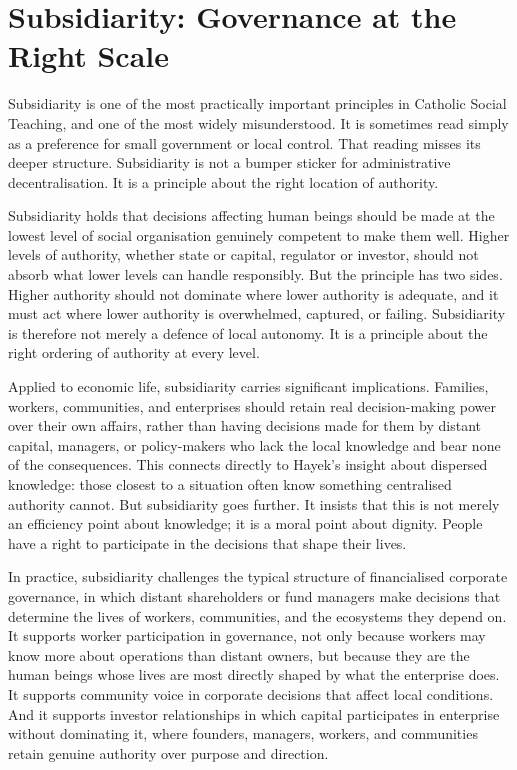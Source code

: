 \documentclass[11pt,a4paper,oneside]{book}
\begin{document}
\section*{Subsidiarity: Governance at the Right Scale}

Subsidiarity is one of the most practically important principles in Catholic Social Teaching, and one of the most widely misunderstood. It is sometimes read simply as a preference for small government or local control. That reading misses its deeper structure. Subsidiarity is not a bumper sticker for administrative decentralisation. It is a principle about the right location of authority.

Subsidiarity holds that decisions affecting human beings should be made at the lowest level of social organisation genuinely competent to make them well. Higher levels of authority, whether state or capital, regulator or investor, should not absorb what lower levels can handle responsibly. But the principle has two sides. Higher authority should not dominate where lower authority is adequate, and it must act where lower authority is overwhelmed, captured, or failing. Subsidiarity is therefore not merely a defence of local autonomy. It is a principle about the right ordering of authority at every level.

Applied to economic life, subsidiarity carries significant implications. Families, workers, communities, and enterprises should retain real decision-making power over their own affairs, rather than having decisions made for them by distant capital, managers, or policy-makers who lack the local knowledge and bear none of the consequences. This connects directly to Hayek's insight about dispersed knowledge: those closest to a situation often know something centralised authority cannot. But subsidiarity goes further. It insists that this is not merely an efficiency point about knowledge; it is a moral point about dignity. People have a right to participate in the decisions that shape their lives.

In practice, subsidiarity challenges the typical structure of financialised corporate governance, in which distant shareholders or fund managers make decisions that determine the lives of workers, communities, and the ecosystems they depend on. It supports worker participation in governance, not only because workers may know more about operations than distant owners, but because they are the human beings whose lives are most directly shaped by what the enterprise does. It supports community voice in corporate decisions that affect local conditions. And it supports investor relationships in which capital participates in enterprise without dominating it, where founders, managers, workers, and communities retain genuine authority over purpose and direction.
\end{document}
